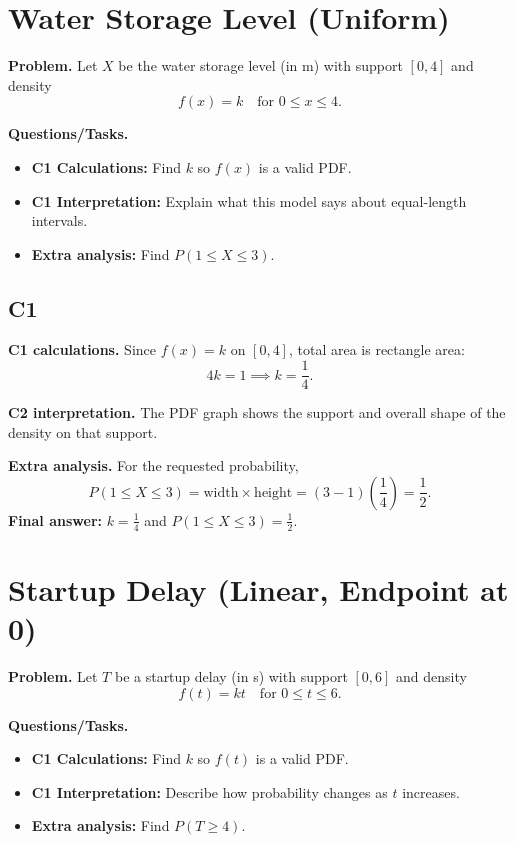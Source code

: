 	\section{Water Storage Level (Uniform)}
	
	\textbf{Problem.}
	Let $X$ be the water storage level (in m) with support $[0,4]$ and density
	\[
	f(x)=k\quad\text{for }0\le x\le 4.
	\]
	
	\textbf{Questions/Tasks.}
	\begin{itemize}
		\item \textbf{C1 Calculations:} Find $k$ so $f(x)$ is a valid PDF.
		\item \textbf{C1 Interpretation:} Explain what this model says about equal-length intervals.
		\item \textbf{Extra analysis:} Find $P(1\le X\le 3)$.
	\end{itemize}

	\subsection*{C1}

\textbf{C1 calculations.}
Since $f(x)=k$ on $[0,4]$, total area is rectangle area:
	\[
	4k=1\implies k=\frac14.
	\]

\textbf{C2 interpretation.}
The PDF graph shows the support and overall shape of the density on that support.

\textbf{Extra analysis.}
For the requested probability,
\[
P(1\le X\le3)=\text{width}\times\text{height}=(3-1)\left(\frac14\right)=\frac12.
\]
\textbf{Final answer:} $k=\frac14$ and $P(1\le X\le3)=\frac12$.
	\section{Startup Delay (Linear, Endpoint at 0)}
	
	\textbf{Problem.}
	Let $T$ be a startup delay (in s) with support $[0,6]$ and density
	\[
	f(t)=kt\quad\text{for }0\le t\le 6.
	\]
	
	\textbf{Questions/Tasks.}
	\begin{itemize}
		\item \textbf{C1 Calculations:} Find $k$ so $f(t)$ is a valid PDF.
		\item \textbf{C1 Interpretation:} Describe how probability changes as $t$ increases.
		\item \textbf{Extra analysis:} Find $P(T\ge 4)$.
	\end{itemize}

